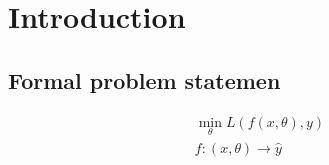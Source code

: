 \documentclass[../main.tex]{subfiles}
\begin{document}
\section{Introduction}
\label{sec:introduction}
\subsection{Formal problem statemen}
\label{subsec:formal_statement}

\begin{align}
    \min_{\theta} L(f(x,\theta),y)\\
    f:(x,\theta) \rightarrow \hat{y}
\end{align}
\end{document}
